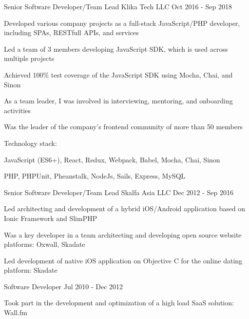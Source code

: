 \begin{cventries}
  \cventry
    {Senior Software Developer/Team Lead} %
    {Klika Tech LLC} %
    {} %
    {Oct 2016 - Sep 2018} %
    {
      \begin{cvitems}
        \item Developed various company projects as a full-stack JavaScript/PHP developer, including SPAs, RESTfull APIs, and services
        \item Led a team of 3 members developing JavaScript SDK, which is used across multiple projects
        \item Achieved 100\% test coverage of the JavaScript SDK using Mocha, Chai, and Sinon
        \item As a team leader, I was involved in interviewing, mentoring, and onboarding activities
        \item Was the leader of the company's frontend community of more than 50 members
      \end{cvitems}
      \vspace{5mm}
      Technology stack:
      \begin{cvstackitems}
        \item JavaScript (ES6+), React, Redux, Webpack, Babel, Mocha, Chai, Sinon
        \item PHP, PHPUnit, Pheanstalk, NodeJs, Sails, Express, MySQL
      \end{cvstackitems}
      \vspace{-4.0mm}
    }

  \cventry
    {Senior Software Developer/Team Lead} %
    {Skalfa Asia LLC} %
    {} %
    {Dec 2012 - Sep 2016} %
    {
      \begin{cvitems}
        \item Led architecting and development of a hybrid iOS/Android application based on Ionic Framework and SlimPHP
        \item Was a key developer in a team architecting and developing open source website platforms: Oxwall, Skadate
        \item Led development of native iOS application on Objective C for the online dating platform: Skadate
      \end{cvitems}
    }

  \cventry
    {Software Developer} %
    {} %
    {} %
    {Jul 2010 - Dec 2012} %
    {
      \begin{cvitems}
        \item Took part in the development and optimization of a high load SaaS solution: Wall.fm
      \end{cvitems}
    }


\end{cventries}
